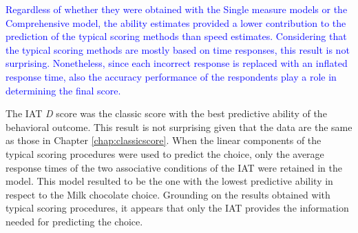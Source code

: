 \documentclass[12pt]{book}
\begin{document}

\textcolor{blue}{Regardless of whether they were obtained with the Single measure models or the Comprehensive model, the ability estimates provided a lower contribution to the prediction of the typical scoring methods than speed estimates. 
 Considering that the typical scoring methods are mostly based on time responses, this result is not surprising. 
Nonetheless, since each incorrect response is replaced with an inflated response time, also the accuracy performance of the respondents play a role in determining the final score. }


The IAT \emph{D} score was the classic score with the best predictive ability of the behavioral outcome. 
This result is not surprising given that the data are the same as those in Chapter \ref{chap:classicscore}.
When the linear components of the typical scoring procedures were used to predict the choice, only the average response times of the two associative conditions of the IAT were retained in the model. 
This model resulted to be the one with the lowest predictive ability in respect to the Milk chocolate choice. 
Grounding on the results obtained with typical scoring procedures, it appears that only the IAT provides the information needed for predicting the choice. 
\end{document}
